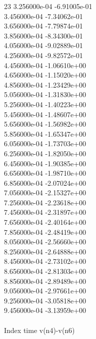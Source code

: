 23	3.256000e-04	-6.91005e-01	\\ 	3.456000e-04	-7.34062e-01	\\ 	3.656000e-04	-7.79874e-01	\\ 	3.856000e-04	-8.34300e-01	\\ 	4.056000e-04	-9.02889e-01	\\ 	4.256000e-04	-9.82572e-01	\\ 	4.456000e-04	-1.06610e+00	\\ 	4.656000e-04	-1.15020e+00	\\ 	4.856000e-04	-1.23429e+00	\\ 	5.056000e-04	-1.31830e+00	\\ 	5.256000e-04	-1.40223e+00	\\ 	5.456000e-04	-1.48607e+00	\\ 	5.656000e-04	-1.56982e+00	\\ 	5.856000e-04	-1.65347e+00	\\ 	6.056000e-04	-1.73703e+00	\\ 	6.256000e-04	-1.82050e+00	\\ 	6.456000e-04	-1.90385e+00	\\ 	6.656000e-04	-1.98710e+00	\\ 	6.856000e-04	-2.07024e+00	\\ 	7.056000e-04	-2.15327e+00	\\ 	7.256000e-04	-2.23618e+00	\\ 	7.456000e-04	-2.31897e+00	\\ 	7.656000e-04	-2.40164e+00	\\ 	7.856000e-04	-2.48419e+00	\\ 	8.056000e-04	-2.56660e+00	\\ 	8.256000e-04	-2.64888e+00	\\ 	8.456000e-04	-2.73102e+00	\\ 	8.656000e-04	-2.81303e+00	\\ 	8.856000e-04	-2.89489e+00	\\ 	9.056000e-04	-2.97661e+00	\\ 	9.256000e-04	-3.05818e+00	\\ 	9.456000e-04	-3.13959e+00	\\ \hline
\\ \hline
Index   time            v(n4)-v(n6)     \\ \hline
